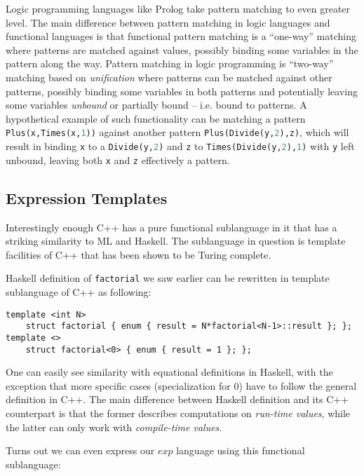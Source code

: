 \documentclass[preprint]{sigplanconf}
\makeatletter
\DeclareRobustCommand{\code}[1]{{\lstinline[breaklines=false,escapechar=@]{#1}}}
\DeclareRobustCommand{\codeocaml}[1]{{\lstinline[breaklines=false,language=Caml]{#1}}}
\makeatother
\begin{document}
Logic programming languages like Prolog take pattern matching to even greater 
level. The main difference between pattern matching in logic languages and 
functional languages is that functional pattern matching is a ``one-way'' 
matching where patterns are matched against values, possibly binding some 
variables in the pattern along the way. Pattern matching in logic programming is 
``two-way'' matching based on \emph{unification} where patterns can be matched 
against other patterns, possibly binding some variables in both patterns and 
potentially leaving some variables \emph{unbound} or partially bound -- i.e. 
bound to patterns. A hypothetical example of such functionality can be matching 
a pattern \codeocaml{Plus(x,Times(x,1))} against another pattern 
\codeocaml{Plus(Divide(y,2),z)}, which will result in binding \codeocaml{x} to a 
\codeocaml{Divide(y,2)} and \codeocaml{z} to \codeocaml{Times(Divide(y,2),1)} 
with \codeocaml{y} left unbound, leaving both \codeocaml{x} and \codeocaml{z} 
effectively a pattern.

\subsection{Expression Templates}

Interestingly enough C++ has a pure functional sublanguage in it that has a 
striking similarity to ML and Haskell. The sublanguage in question is template 
facilities of C++ that has been shown to be Turing 
complete\cite{veldhuizen:templates_turing_complete}. 

Haskell definition of \code{factorial} we saw earlier can be rewritten in 
template sublanguage of C++ as following:

\begin{lstlisting}
template <int N> 
    struct factorial { enum { result = N*factorial<N-1>::result }; };
template <>
    struct factorial<0> { enum { result = 1 }; };
\end{lstlisting}

\noindent
One can easily see similarity with equational definitions in Haskell, with the 
exception that more specific cases (specialization for 0) have to follow the 
general definition in C++. The main difference between Haskell definition and 
its C++ counterpart is that the former describes computations on \emph{run-time 
values}, while the latter can only work with \emph{compile-time values}.

Turns out we can even express our $exp$ language using this functional 
sublanguage:
\end{document}
